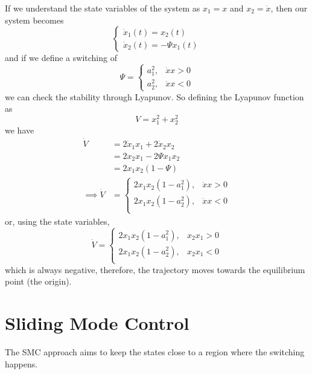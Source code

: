 If we understand the state variables of the system as $x_1=x$ and $x_2=\dot{x}$, then our system becomes \[
\begin{cases}
    \dot{x}_1(t)=x_2(t) \\
    \dot{x}_2(t)=-\Psi x_1(t)
\end{cases}
\] and if we define a switching of \[
\Psi = \begin{cases}
    a_1^{2}, & \dot{x}x>0 \\
    a_2^{2}, & \dot{x}x < 0
\end{cases}
\] we can check the stability through Lyapunov. So defining the Lyapunov function as \[
V = x_1^{2} + x_2^{2}
\] we have 
\begin{align*}
    \dot{V} &= 2 \dot{x}_1 x_1 + 2 \dot{x}_2 x_2 \\
	    &= 2 x_2 x_1 - 2 \Psi x_1 x_2 \\
	    &= 2x_1x_2(1-\Psi) \\
    \implies \dot{V} &= \begin{cases}
	2x_1x_2(1-a_1^{2}), & \dot{x}x > 0 \\
	2x_1x_2(1-a_2^{2}), & \dot{x}x < 0 \\
    \end{cases}
\end{align*}
or, using the state variables, \[
    \dot{V} = \begin{cases}
	2x_1x_2(1-a_1^{2}), & x_2x_1 > 0 \\
	2x_1x_2(1-a_2^{2}), & x_2x_1 < 0 \\
    \end{cases}
\] which is always negative, therefore, the trajectory moves towards the equilibrium point (the origin).

\section*{Sliding Mode Control}

The SMC approach aims to keep the states close to a region where the switching happens.

